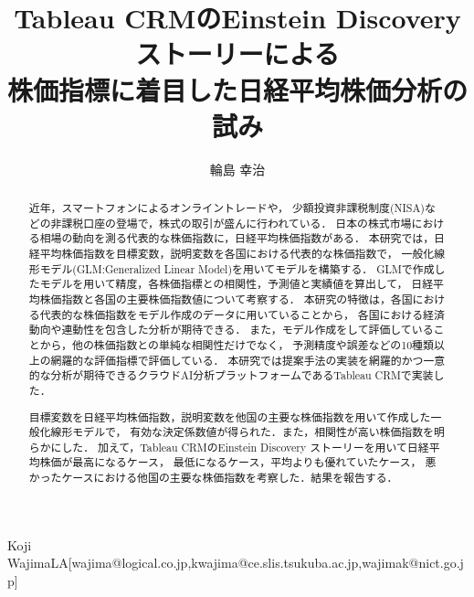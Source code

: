 \documentclass[submit,techrep,noauthor]{ipsj}
\begin{document}
\title{Tableau CRMのEinstein Discovery ストーリーによる\\株価指標に着目した日経平均株価分析の試み}



\author{輪島 幸治}{Koji Wajima}{LA}[wajima@logical.co.jp,kwajima@ce.slis.tsukuba.ac.jp,wajimak@nict.go.jp]

\begin{abstract}
近年，スマートフォンによるオンライントレードや，
少額投資非課税制度(NISA)などの非課税口座の登場で，株式の取引が盛んに行われている．
日本の株式市場における相場の動向を測る代表的な株価指数に，日経平均株価指数がある．
%
本研究では，日経平均株価指数を目標変数，説明変数を各国における代表的な株価指数で，
一般化線形モデル(GLM:Generalized Linear Model)を用いてモデルを構築する．
GLMで作成したモデルを用いて精度，各株価指標との相関性，予測値と実績値を算出して，
日経平均株価指数と各国の主要株価指数値について考察する．
%
本研究の特徴は，各国における代表的な株価指数をモデル作成のデータに用いていることから，
各国における経済動向や連動性を包含した分析が期待できる．
また，モデル作成をして評価していることから，他の株価指数との単純な相関性だけでなく，
予測精度や誤差などの10種類以上の網羅的な評価指標で評価している．
本研究では提案手法の実装を網羅的かつ一意的な分析が期待できるクラウドAI分析プラットフォームであるTableau CRMで実装した．

目標変数を日経平均株価指数，説明変数を他国の主要な株価指数を用いて作成した一般化線形モデルで，
有効な決定係数値が得られた．また，相関性が高い株価指数を明らかにした．
加えて，Tableau CRMのEinstein Discovery ストーリーを用いて日経平均株価が最高になるケース，
最低になるケース，平均よりも優れていたケース，
悪かったケースにおける他国の主要な株価指数を考察した．結果を報告する．

\end{abstract}


%
%
%
\end{document}
